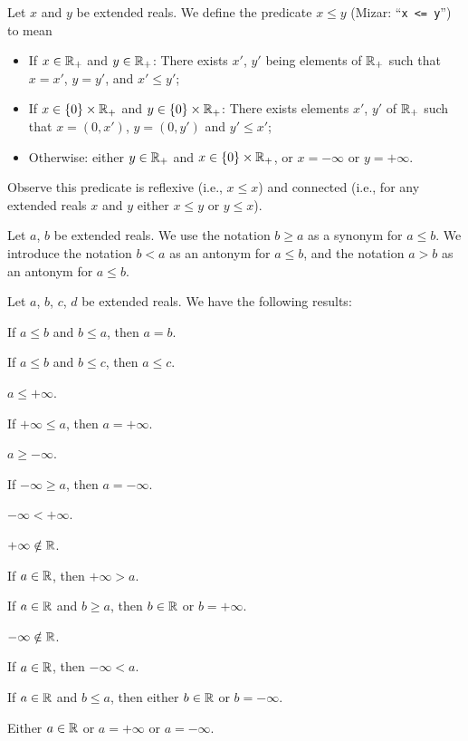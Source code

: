 \documentclass{article}
\begin{document}
\begin{definition}
Let $x$ and $y$ be extended reals.
We define the predicate $x\leq y$ (Mizar: ``\verb#x <= y#'') to mean
\begin{defn}
\item \begin{itemize}
\item If $x\in\mathbb{R}_{+}$ and $y\in\mathbb{R}_{+}$: There exists $x'$, $y'$ being
  elements of $\mathbb{R}_{+}$ such that $x=x'$, $y=y'$, and $x'\leq y'$;
\item If $x\in\{0\}\times\mathbb{R}_{+}$ and $y\in\{0\}\times\mathbb{R}_{+}$: There
  exists elements $x'$, $y'$ of $\mathbb{R}_{+}$ such that $x=(0,x')$,
  $y=(0,y')$ and $y'\leq x'$;
\item Otherwise: either $y\in\mathbb{R}_{+}$ and $x\in\{0\}\times\mathbb{R}_{+}$,
  or $x=-\infty$ or $y=+\infty$.
\end{itemize}
\end{defn}
Observe this predicate is reflexive (i.e., $x\leq x$) and connected
(i.e., for any extended reals $x$ and $y$ either $x\leq y$ or $y\leq x$).
\end{definition}

\begin{notation}
Let $a$, $b$ be extended reals.
We use the notation $b\geq a$ as a synonym for $a\leq b$.
We introduce the notation $b<a$ as an antonym for $a\leq b$,
and the notation $a>b$ as an antonym for $a\leq b$.
\end{notation}

Let $a$, $b$, $c$, $d$ be extended reals.
We have the following results:
\begin{thm}
\item\label{xxreal0:1} If $a\leq b$ and $b\leq a$, then $a=b$.
\item\label{xxreal0:2} If $a\leq b$ and $b\leq c$, then $a\leq c$.
\item\label{xxreal0:3} $a\leq+\infty$.
\item\label{xxreal0:4} If $+\infty\leq a$, then $a=+\infty$.
\item\label{xxreal0:5} $a\geq-\infty$.
\item\label{xxreal0:6} If $-\infty\geq a$, then $a=-\infty$.
\item\label{xxreal0:7} $-\infty < +\infty$.
\item\label{xxreal0:8} $+\infty\notin\mathbb{R}$.
\item\label{xxreal0:9} If $a\in\mathbb{R}$, then $+\infty>a$.
\item\label{xxreal0:10} If $a\in\mathbb{R}$ and $b\geq a$, then $b\in\mathbb{R}$ or $b=+\infty$.
\item\label{xxreal0:11} $-\infty\notin\mathbb{R}$.
\item\label{xxreal0:12} If $a\in\mathbb{R}$, then $-\infty<a$.
\item\label{xxreal0:13} If $a\in\mathbb{R}$ and $b\leq a$, then either
  $b\in\mathbb{R}$ or $b=-\infty$.
\item\label{xxreal0:14} Either $a\in\mathbb{R}$ or $a=+\infty$ or $a=-\infty$.
\end{thm}
\end{document}
